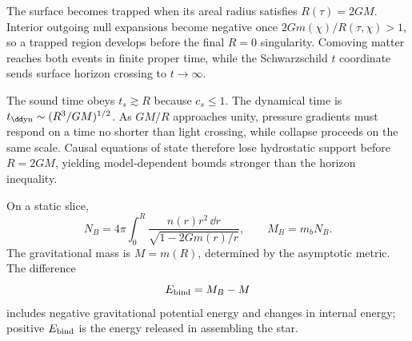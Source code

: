 \begin{solution}
The surface becomes trapped when its areal radius satisfies \(R(\tau)=2GM\).
Interior outgoing null expansions become negative once
\(2Gm(\chi)/R(\tau,\chi)>1\), so a trapped region develops before the final
\(R=0\) singularity.  Comoving matter reaches both events in finite proper
time, while the Schwarzschild \(t\) coordinate sends surface horizon crossing
to \(t\to\infty\).
\end{solution}

\begin{solution}
The sound time obeys \(t_s\gtrsim R\) because \(c_s\leq1\).  The dynamical
time is \(t_{\rm \dd yn}\sim(R^3/GM)^{1/2}\).  As \(GM/R\) approaches unity,
pressure gradients must respond on a time no shorter than light crossing,
while collapse proceeds on the same scale.  Causal equations of state
therefore lose hydrostatic support before \(R=2GM\), yielding model-dependent
bounds stronger than the horizon inequality.
\end{solution}

\begin{solution}
On a static slice,
\[
N_B=4\pi\int_0^R
\frac{n(r)r^2\,\dd r}{\sqrt{1-2Gm(r)/r}},
\qquad M_B=m_bN_B.
\]
The gravitational mass is \(M=m(R)\), determined by the asymptotic metric.
The difference
\[
E_{\rm bind}=M_B-M
\]
includes negative gravitational potential energy and changes in internal
energy; positive \(E_{\rm bind}\) is the energy released in assembling the
star.
\end{solution}
